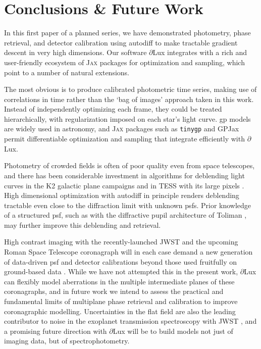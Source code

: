 \documentclass[twocolumn]{spie}
\newcommand\jax{\textsc{Jax}\xspace}
\newcommand\dlux{$\partial$Lux\xspace}
\begin{document}

\section{Conclusions \& Future Work}
In this first paper of a planned series, we have demonstrated photometry, phase retrieval, and detector calibration using autodiff to make tractable gradient descent in very high dimensions. Our software \dlux integrates with a rich and user-friendly ecosystem of \jax packages for optimization and sampling, which point to a number of natural extensions.

The most obvious is to produce calibrated photometric time series, making use of correlations in time rather than the `bag of images' approach taken in this work. Instead of independently optimizing each frame, they could be treated hierarchically, with regularization imposed on each star's light curve. \ac{gp} models are widely used in astronomy, and \jax packages such as \texttt{tinygp} \cite{Aigrain2022} and GPJax \cite{Pinder2022} permit differentiable optimization and sampling that integrate efficiently with \dlux. 

Photometry of crowded fields is often of poor quality even from space telescopes, and there has been considerable investment in algorithms for deblending light curves in the K2 galactic plane campaigns \cite{Zhu2017} and in TESS with its large pixels \cite{Nardiello2019,Hedges2021,Higgins2022}. High dimensional optimization with autodiff in principle renders deblending tractable even close to the diffraction limit with unknown \ac{psf}s. Prior knowledge of a structured \ac{psf}, such as with the diffractive pupil architecture of Toliman \cite{Guyon2012,Guyon2013}, may further improve this deblending and retrieval. 

High contrast imaging with the recently-launched JWST \cite{Gardner2006} and the upcoming Roman Space Telescope coronagraph \cite{Zellem2022} will in each case demand a new generation of data-driven \ac{psf} and detector calibrations beyond those used fruitfully on ground-based data \cite{Cantalloube2021}. While we have not attempted this in the present work, \dlux can flexibly model aberrations in the multiple intermediate planes of these coronagraphs, and in future work we intend to assess the practical and fundamental limits of multiplane phase retrieval and calibration to improve coronagraphic modelling.
Uncertainties in the flat field are also the leading contributor to noise in the exoplanet transmission spectroscopy with JWST \cite{Rustamkulov2022}, and a promising future direction with \dlux will be to build models not just of imaging data, but of spectrophotometry.
\end{document}
